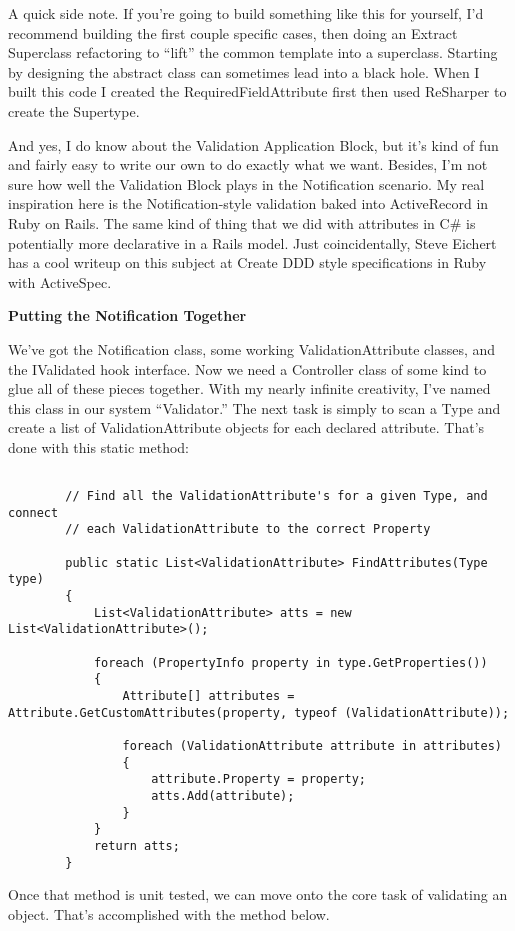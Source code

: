 \documentclass{article}
\begin{document}
{A quick side note.  If you're going to build something like this for yourself, I'd recommend building the first couple specific cases, then doing an Extract Superclass refactoring to “lift” the common template into a superclass.  Starting by designing the abstract class can sometimes lead into a black hole.  When I built this code I created the RequiredFieldAttribute first then used ReSharper to create the Supertype.

And yes, I do know about the Validation Application Block, but it's kind of fun and fairly easy to write our own to do exactly what we want.  Besides, I'm not sure how well the Validation Block plays in the Notification scenario.  My real inspiration here is the Notification-style validation baked into ActiveRecord in Ruby on Rails.  The same kind of thing that we did with attributes in C\# is potentially more declarative in a Rails model.  Just coincidentally, Steve Eichert has a cool writeup on this subject at Create DDD style specifications in Ruby with ActiveSpec.

 
\Large {\textbf{Putting the Notification Together}}

We've got the Notification class, some working ValidationAttribute classes, and the IValidated hook interface.  Now we need a Controller class of some kind to glue all of these pieces together.  With my nearly infinite creativity, I've named this class in our system “Validator.”  The next task is simply to scan a Type and create a list of ValidationAttribute objects for each declared attribute.  That's done with this static method:
 \begin{lstlisting}

        // Find all the ValidationAttribute's for a given Type, and connect
        // each ValidationAttribute to the correct Property

        public static List<ValidationAttribute> FindAttributes(Type type)
        {
            List<ValidationAttribute> atts = new List<ValidationAttribute>(); 

            foreach (PropertyInfo property in type.GetProperties())
            {
                Attribute[] attributes = Attribute.GetCustomAttributes(property, typeof (ValidationAttribute));
				
                foreach (ValidationAttribute attribute in attributes)
                {
                    attribute.Property = property;
                    atts.Add(attribute);
                }
            }
            return atts;
        }
\end{lstlisting}
Once that method is unit tested, we can move onto the core task of validating an object.  That's accomplished with the method below.

}
\end{document}
